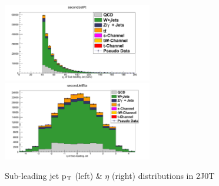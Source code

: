 \\
\begin{figure}[hbpt]
\begin{center}
\caption{Sub-leading jet p$_{\rm{T}}$ (left) \& $\eta$ (right) distributions in 2J0T}
\includegraphics[width=6.5cm]{figures/2J0T/secondJetPt.png}
\includegraphics[width=6.5cm]{figures/2J0T/secondJetEta.png}\hfill
\end{center}
\end{figure}

